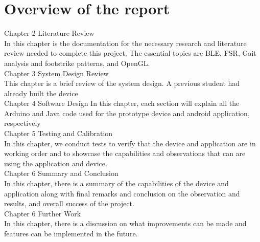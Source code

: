\section{Overview of the report}

Chapter 2 Literature Review\\
In this chapter is the documentation for the necessary research and literature review needed to complete this project. The essential topics are BLE, FSR, Gait analysis and footstrike patterns, and OpenGL.\\
Chapter 3 System Design Review\\
This chapter is a brief review of the system design. A previous student had already built the device\\
Chapter 4 Software Design
In this chapter, each section will explain all the Arduino and Java code used for the prototype device and android application, respectively\\
Chapter 5 Testing and Calibration\\
In this chapter, we conduct tests to verify that the device and application are in working order and to showcase the capabilities and observations that can are using the application and device. \\
Chapter 6 Summary  and Conclusion\\
In this chapter, there is a summary of the capabilities of the device and application along with final remarks and conclusion on the observation and results, and overall success of the project.\\
Chapter 6 Further Work\\
In this chapter, there is a discussion on what improvements can be made and  features can be implemented in the future.






